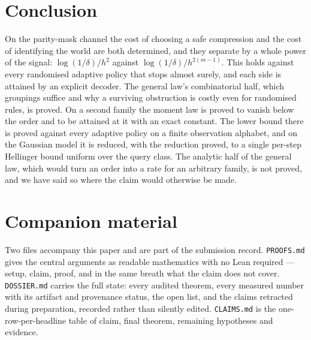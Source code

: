 \section{Conclusion}

On the parity-mask channel the cost of choosing a safe compression and the cost of
identifying the world are both determined, and they separate by a whole power of the
signal: $\log(1/\delta)/h^{2}$ against $\log(1/\delta)/h^{2(m-1)}$. This holds against every
randomised adaptive policy that stops almost surely, and each side is attained by an explicit
decoder. The general law's combinatorial half, which groupings suffice and why a surviving
obstruction is costly even for randomised rules, is proved. On a second family the moment
law is proved to vanish below the order and to be attained at it with an exact constant. The
lower bound there is proved against every adaptive policy on a finite observation alphabet,
and on the Gaussian model it is reduced, with the reduction proved, to a single per-step
Hellinger bound uniform over the query class. The analytic half of the general law, which
would turn an order into a rate for an arbitrary family, is not proved, and we have said so
where the claim would otherwise be made.

\section*{Companion material}
Two files accompany this paper and are part of the submission record.
\texttt{PROOFS.md} gives the central arguments as readable mathematics with no Lean
required --- setup, claim, proof, and in the same breath what the claim does not
cover. \texttt{DOSSIER.md} carries the full state: every audited theorem, every
measured number with its artifact and provenance status, the open list, and the
claims retracted during preparation, recorded rather than silently edited.
\texttt{CLAIMS.md} is the one-row-per-headline table of claim, final theorem,
remaining hypotheses and evidence.

